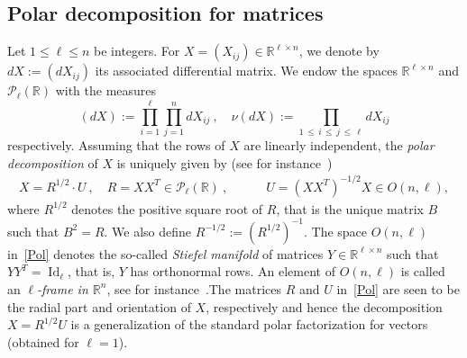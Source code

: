 \documentclass[AHL,Unicode,longabstracts,published]{cedram}
\DeclareMathOperator{\Id}{Id}
\newcommand{\clP}{\mathcal{P}}
\newcommand{\R}{\mathbb{R}}
\begin{document}
\subsection{Polar decomposition for matrices}\label{SecPD}

Let $1\leq \ell \leq n$ be integers. For $X=(X_{ij}) \in \R^{\ell \times n}$, we denote by $dX:=(dX_{ij})$ its associated differential matrix. We endow the spaces $\R^{\ell \times n}$ and $\clP_{\ell}(\R)$ with the measures
\[
(dX) := \prod_{i=1}^{\ell}\prod_{j=1}^{n} dX_{ij} \ , \quad
\nu(dX) := \prod_{1\,\leq\,i\,\leq\,j\,\leq\,\ell} dX_{ij}
\]
respectively. Assuming that the rows of $X$ are linearly independent, the \emph{polar decomposition} of $X$ is uniquely given by (see for instance~\cite{Downs})
\begin{gather}\label{Pol}
X = R^{1/2} \cdot U \ , \quad R = XX^T \in \clP_{\ell}(\R) \ , \quad
\qquad U = \left(XX^T\right)^{-1/2}X \in O(n,\ell),
\end{gather}
where $R^{1/2}$ denotes the positive square root of $R$, that is the unique matrix $B$ such that $B^2=R$. We also define $R^{-1/2}:=(R^{1/2})^{-1}$. The space $O(n,\ell)$ in~\eqref{Pol} denotes the so-called \emph{Stiefel manifold} of matrices $Y \in \R^{\ell \times n}$ such that $YY^T= \Id_{\ell}$, that is, $Y$ has orthonormal rows. An element of $O(n,\ell)$ is called an \emph{$\ell$-frame in $\R^n$}, see for instance~\cite[p.~8]{Ch2012}.The matrices $R$ and $U$ in~\eqref{Pol} are seen to be the radial part and orientation of $X$, respectively and hence the decomposition $X=R^{1/2}U$ is a generalization of the standard polar factorization for vectors (obtained for $\ell=1$).
\end{document}
